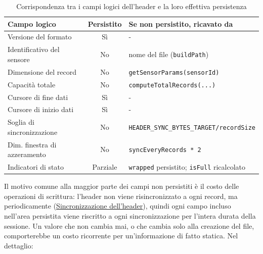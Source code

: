 \begin{table}[H]
\centering
\begin{tabular}{l c l}
\hline
\textbf{Campo logico} & \textbf{Persistito} & \textbf{Se non persistito, ricavato da} \\
\hline
Versione del formato & Sì & - \\
Identificativo del sensore & No & nome del file (\texttt{buildPath}) \\
Dimensione del record & No & \texttt{getSensorParams(sensorId)} \\
Capacità totale & No & \texttt{computeTotalRecords(...)} \\
Cursore di fine dati & Sì & - \\
Cursore di inizio dati & Sì & - \\
Soglia di sincronizzazione & No & \texttt{HEADER\_SYNC\_BYTES\_TARGET/recordSize} \\
Dim. finestra di azzeramento & No & \texttt{syncEveryRecords * 2} \\
Indicatori di stato & Parziale & \texttt{wrapped} persistito; \texttt{isFull} ricalcolato \\
\hline
\end{tabular}
\caption{Corrispondenza tra i campi logici dell'header e la loro effettiva persistenza}
\label{tab:header-logico-persistito}
\end{table}

Il motivo comune alla maggior parte dei campi non persistiti è il costo delle
operazioni di scrittura: l'header non viene risincronizzato a ogni record, ma
periodicamente (\hyperref[subsec:sincronizzazione_header]{Sincronizzazione
dell'header}), quindi ogni campo incluso nell'area persistita viene riscritto
a ogni sincronizzazione per l'intera durata della sessione. Un valore che non
cambia mai, o che cambia solo alla creazione del file, comporterebbe un costo
ricorrente per un'informazione di fatto statica. Nel dettaglio:


